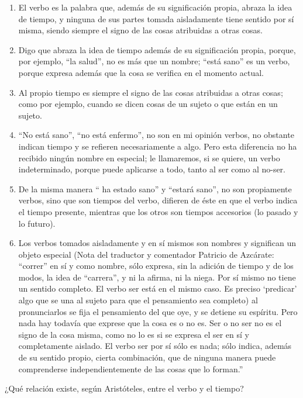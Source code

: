 \documentclass{article}
\begin{document}
\begin{enumerate}
    \item El verbo es la palabra que, además de su significación propia, abraza la idea de tiempo, y ninguna de sus partes tomada aisladamente tiene sentido por sí misma, siendo siempre el signo de las cosas atribuidas a otras cosas.
    \item Digo que abraza la idea de tiempo además de su significación propia, porque, por ejemplo, ``la salud'', no es más que un nombre; ``está sano'' es un verbo, porque expresa además que la cosa se verifica en el momento actual.
    \item Al propio tiempo es siempre el signo de las cosas atribuidas a otras cosas; como por ejemplo, cuando se dicen cosas de un sujeto o que están en un sujeto.
    \item ``No está sano'', ``no está enfermo'', no son en mi opinión verbos, no obstante indican tiempo y se refieren necesariamente a algo. Pero esta diferencia no ha recibido ningún nombre en especial; le llamaremos, si se quiere, un verbo indeterminado, porque puede aplicarse a todo, tanto al ser como al no-ser.
    \item De la misma manera `` ha estado sano'' y ``estará sano'', no son propiamente verbos, sino que son tiempos del verbo, difieren de éste en que el verbo indica el tiempo presente, mientras que los otros son  tiempos accesorios (lo pasado y lo futuro).
    \item Los verbos tomados aisladamente y en sí mismos son nombres y significan un objeto especial (Nota del traductor y comentador Patricio de Azcárate: ``correr'' en sí y como nombre, sólo expresa, sin la adición de tiempo y de los modos, la idea de ``carrera'', y ni la afirma, ni la niega. Por sí mismo no tiene un sentido completo. El verbo ser está en el mismo caso. Es preciso `predicar' algo que se una al sujeto para que el pensamiento sea completo) al pronunciarlos se fija el pensamiento del que oye, y se detiene su espíritu. Pero nada hay todavía que exprese que la cosa es o no es. Ser o no ser no es el signo de la cosa misma, como no lo es si se expresa el ser en sí y completamente aislado. El verbo ser por sí sólo es nada; sólo indica, además de su sentido propio, cierta combinación, que de ninguna manera puede comprenderse independientemente de las cosas que lo forman.'' 
\end{enumerate}

\noindent ¿Qué relación existe, según Aristóteles, entre el verbo y el tiempo?
    
\end{document}
